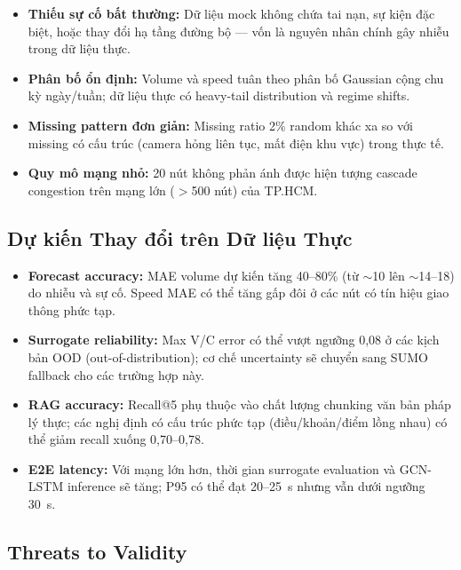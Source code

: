 \begin{itemize}[itemsep=3pt]
  \item \textbf{Thiếu sự cố bất thường:} Dữ liệu mock không chứa tai nạn, sự kiện đặc biệt, hoặc thay đổi hạ tầng đường bộ --- vốn là nguyên nhân chính gây nhiễu trong dữ liệu thực.
  \item \textbf{Phân bố ổn định:} Volume và speed tuân theo phân bố Gaussian cộng chu kỳ ngày/tuần; dữ liệu thực có heavy-tail distribution và regime shifts.
  \item \textbf{Missing pattern đơn giản:} Missing ratio 2\% random khác xa so với missing có cấu trúc (camera hỏng liên tục, mất điện khu vực) trong thực tế.
  \item \textbf{Quy mô mạng nhỏ:} 20 nút không phản ánh được hiện tượng cascade congestion trên mạng lớn ($>$500 nút) của TP.HCM.
\end{itemize}

\subsection{Dự kiến Thay đổi trên Dữ liệu Thực}

\begin{itemize}[itemsep=3pt]
  \item \textbf{Forecast accuracy:} MAE volume dự kiến tăng 40--80\% (từ $\sim$10 lên $\sim$14--18) do nhiễu và sự cố. Speed MAE có thể tăng gấp đôi ở các nút có tín hiệu giao thông phức tạp.
  \item \textbf{Surrogate reliability:} Max V/C error có thể vượt ngưỡng 0,08 ở các kịch bản OOD (out-of-distribution); cơ chế uncertainty sẽ chuyển sang SUMO fallback cho các trường hợp này.
  \item \textbf{RAG accuracy:} Recall@5 phụ thuộc vào chất lượng chunking văn bản pháp lý thực; các nghị định có cấu trúc phức tạp (điều/khoản/điểm lồng nhau) có thể giảm recall xuống 0,70--0,78.
  \item \textbf{E2E latency:} Với mạng lớn hơn, thời gian surrogate evaluation và GCN-LSTM inference sẽ tăng; P95 có thể đạt 20--25~s nhưng vẫn dưới ngưỡng 30~s.
\end{itemize}

\subsection{Threats to Validity}

